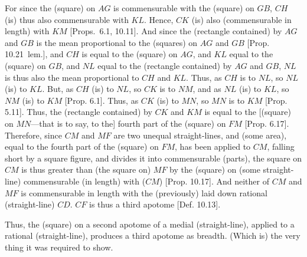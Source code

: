 \begin{Parallel}{}{}
{For since the (square) on $AG$ is commensurable with the (square) on 
$GB$, $CH$ (is) thus also commensurable with $KL$. Hence,
$CK$ (is) also  (commensurable in length) with $KM$ [Props.~6.1, 10.11]. 
And since the (rectangle contained) by $AG$ and $GB$ is the mean
proportional to the (squares) on $AG$ and $GB$ [Prop. 10.21~lem.], and $CH$
is equal to the (square) on $AG$, and $KL$ equal to the (square) on  $GB$,
and $NL$ equal to the (rectangle contained) by $AG$ and $GB$, $NL$ is
thus also the mean proportional to $CH$ and $KL$. Thus, as $CH$ is to
$NL$, so $NL$ (is) to $KL$. But, as $CH$ (is) to $NL$, so $CK$
is to $NM$, and as $NL$ (is) to $KL$, so $NM$ (is) to $KM$
[Prop. 6.1]. Thus, as $CK$ (is) to $MN$, so $MN$
is to $KM$ [Prop. 5.11]. Thus, the (rectangle contained) by $CK$ and $KM$
is equal to the [(square) on $MN$---that is to say, to the] fourth part of the
(square) on $FM$ [Prop. 6.17]. Therefore,
since $CM$ and $MF$ are two unequal straight-lines, and
(some area), equal to the fourth part of the (square) on  $FM$, has been
applied to $CM$, falling short by a square figure, and divides it into
commensurable (parts),  the square on $CM$ is thus greater than (the square on) $MF$ by the (square) on (some straight-line) commensurable
(in length) with ($CM$) [Prop. 10.17]. 
And neither of $CM$ and $MF$ is commensurable in length with the
(previously) laid down rational (straight-line) $CD$. $CF$ is thus a
third apotome [Def. 10.13].

Thus, the (square) on a second apotome of a medial
(straight-line), applied to a rational (straight-line), produces  a
third apotome as breadth. (Which is) the very thing it was required to show.}
\end{Parallel}

